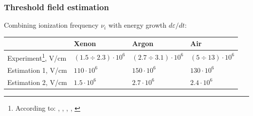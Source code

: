 \documentclass{beamer}
\begin{document}
	\begin{frame}
		\frametitle{Threshold field estimation}
		
		Combining ionization frequency $\nu_i$ with energy growth $d\varepsilon/dt$:
		\begin{center}
		\end{center}
	
		\footnotesize
		\begin{table}[]
			\begin{tabular}{llll}
				\hline
				                   & Xenon            & Argon            & Air              \\ \hline
				Experiment\footnote{According to: \cite{raizer}, \cite{argon_threshold}, \cite{xenon_threshold}, \cite{air_breakdown}, \cite{air_threshold}}, V/cm & $(1.5 \div 2.3) \cdot 10^6$ & $(2.7 \div 3.1) \cdot 10^6$ & $(5 \div 13) \cdot 10^6$ \\
				Estimation 1, V/cm & $110 \cdot 10^6$ & $150 \cdot 10^6$ & $130 \cdot 10^6$ \\
				Estimation 2, V/cm & $1.5 \cdot 10^6$ & $2.7 \cdot 10^6$ & $2.4 \cdot 10^6$ \\ \hline
			\end{tabular}
		\end{table}
		
		
		

\end{frame}
\end{document}
